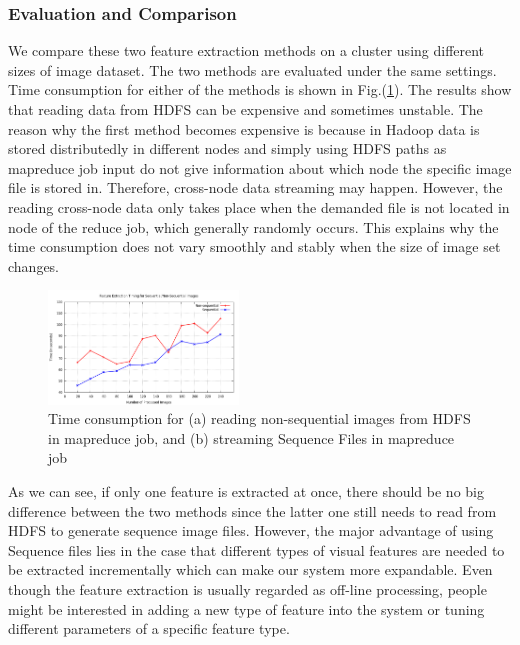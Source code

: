 \documentclass{acm_proc_article-sp}
\begin{document}
\subsubsection{Evaluation and Comparison} We compare these two feature extraction methods on a cluster using different sizes of image dataset.
The two methods are evaluated under the same settings. Time consumption for either of the methods is shown
in Fig.(\ref{fig:time}). The results show that reading data from HDFS can be expensive and sometimes unstable.
The reason why the first method becomes expensive is because in Hadoop data is stored distributedly in different nodes
and simply using HDFS paths as mapreduce job input do not give information about which node the specific image file is stored in.
Therefore, cross-node data streaming may happen. However, the reading cross-node data only takes place when the demanded file is not located in node of the reduce job, which
generally randomly occurs. This explains why the time consumption does not vary smoothly and stably when the size of image set changes.
\begin{figure}[!htb]
 \centering
 \includegraphics[width=0.45\textwidth]{fig/timing}
 \caption{Time consumption for (a) reading non-sequential images from HDFS in mapreduce job, and (b) streaming Sequence Files in mapreduce job}
 \label{fig:time}
\end{figure}
As we can see, if only one feature is extracted at once, there should be no big difference between the two methods since the latter one still needs to read from HDFS to generate sequence image files. However, the major advantage of using Sequence files lies in the case that different types of visual features are needed to be extracted incrementally which can make our system more expandable. Even though the feature extraction is usually regarded as off-line processing, people might be interested in adding a new type of feature  into the system or tuning different parameters of a specific feature type.
\end{document}
